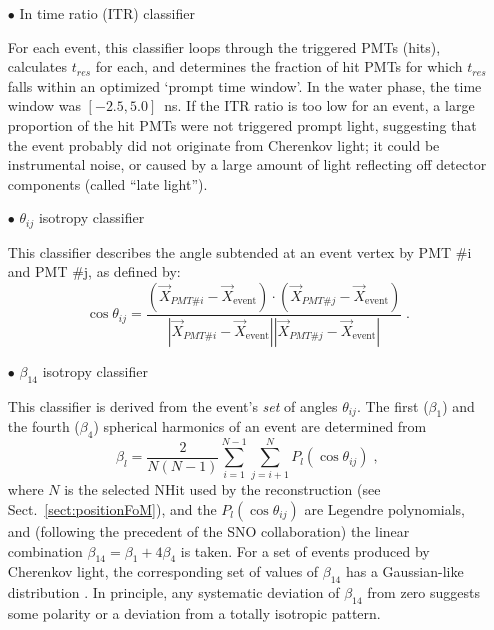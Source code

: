 \begin{itemize}
	\item[$\bullet$] In time ratio (ITR) classifier
	
	For each event, this classifier loops through the triggered PMTs (hits), calculates $t_{res}$ for each, and determines the fraction of hit PMTs for which $t_{res}$ falls within an optimized `prompt time window'. In the water phase, the time window was $[-2.5,5.0]$~ns. If the ITR ratio is too low for an event, a large proportion of the hit PMTs were not triggered prompt light, suggesting that the event probably did not originate from Cherenkov light; it could be instrumental noise, or caused by a large amount of light reflecting off detector components (called ``late light''). 
	
	\item[$\bullet$] $\theta_{ij}$ isotropy classifier

	This classifier describes the angle subtended at an event vertex by PMT \#i and PMT \#j, as defined by:
	\begin{equation}
	\cos\theta_{ij}=\frac{(\vec{X}_{PMT\#i}- \vec{X}_\mathrm{event})\cdot (\vec{X}_{PMT\#j}- \vec{X}_\mathrm{event})}{|\vec{X}_{PMT\#i}- \vec{X}_\mathrm{event}||\vec{X}_{PMT\#j}- \vec{X}_\mathrm{event}|}\;.
	\end{equation}
	\item[$\bullet$] $\beta_{14}$ isotropy classifier
	
	This classifier is derived from the event's {\em set} of angles $\theta_{ij}$. The first ($\beta_1$) and the fourth ($\beta_4$) spherical harmonics of an event are determined from
	\begin{equation}
	\beta_l = \frac{2}{N(N-1)}\sum_{i=1}^{N-1}\sum_{j=i+1}^N P_l(\cos\theta_{ij}) \; ,
	\end{equation}
	where $N$ is the selected NHit used by the reconstruction (see Sect.~\ref{sect:positionFoM}), and the $P_l(\cos\theta_{ij})$ are Legendre polynomials, and (following the precedent of the SNO collaboration) the linear combination $\beta_{14}=\beta_1+4\beta_4$ is taken. For a set of events produced by Cherenkov light, the corresponding set of values of $\beta_{14}$ has a Gaussian-like distribution \cite{dunmore2004separation}. In principle, any systematic deviation of $\beta_{14}$ from zero suggests some polarity or a deviation from a totally isotropic pattern.
	
\end{itemize}

